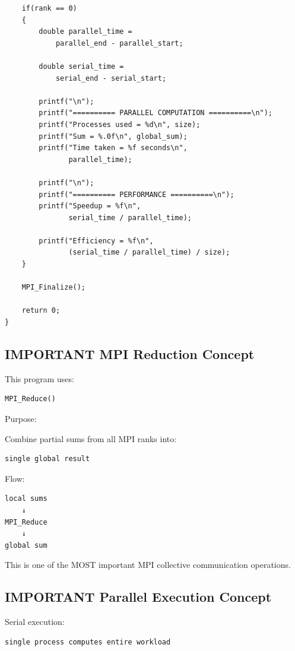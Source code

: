 \documentclass[11pt]{article}
\begin{document}
\begin{verbatim}
    if(rank == 0)
    {
        double parallel_time =
            parallel_end - parallel_start;

        double serial_time =
            serial_end - serial_start;

        printf("\n");
        printf("========== PARALLEL COMPUTATION ==========\n");
        printf("Processes used = %d\n", size);
        printf("Sum = %.0f\n", global_sum);
        printf("Time taken = %f seconds\n",
               parallel_time);

        printf("\n");
        printf("========== PERFORMANCE ==========\n");
        printf("Speedup = %f\n",
               serial_time / parallel_time);

        printf("Efficiency = %f\n",
               (serial_time / parallel_time) / size);
    }

    MPI_Finalize();

    return 0;
}
\end{verbatim}
\subsection{IMPORTANT MPI Reduction Concept}
\label{sec:orgdd6ca9d}

This program uses:

\begin{verbatim}
MPI_Reduce()
\end{verbatim}

Purpose:

Combine partial sums from all MPI ranks into:

\begin{verbatim}
single global result
\end{verbatim}

Flow:

\begin{verbatim}
local sums
    ↓
MPI_Reduce
    ↓
global sum
\end{verbatim}

This is one of the MOST important MPI collective communication operations.
\subsection{IMPORTANT Parallel Execution Concept}
\label{sec:org743fa77}

Serial execution:

\begin{verbatim}
single process computes entire workload
\end{verbatim}
\end{document}
